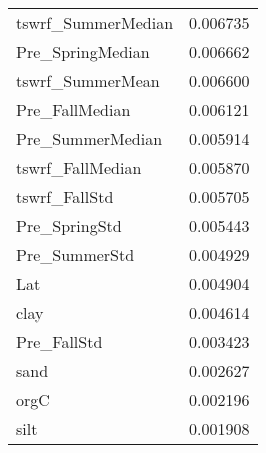 \begin{tabular}{lr}
tswrf_SummerMedian & 0.006735 \\
Pre_SpringMedian & 0.006662 \\
tswrf_SummerMean & 0.006600 \\
Pre_FallMedian & 0.006121 \\
Pre_SummerMedian & 0.005914 \\
tswrf_FallMedian & 0.005870 \\
tswrf_FallStd & 0.005705 \\
Pre_SpringStd & 0.005443 \\
Pre_SummerStd & 0.004929 \\
Lat & 0.004904 \\
clay & 0.004614 \\
Pre_FallStd & 0.003423 \\
sand & 0.002627 \\
orgC & 0.002196 \\
silt & 0.001908 \\
\bottomrule
\end{tabular}
